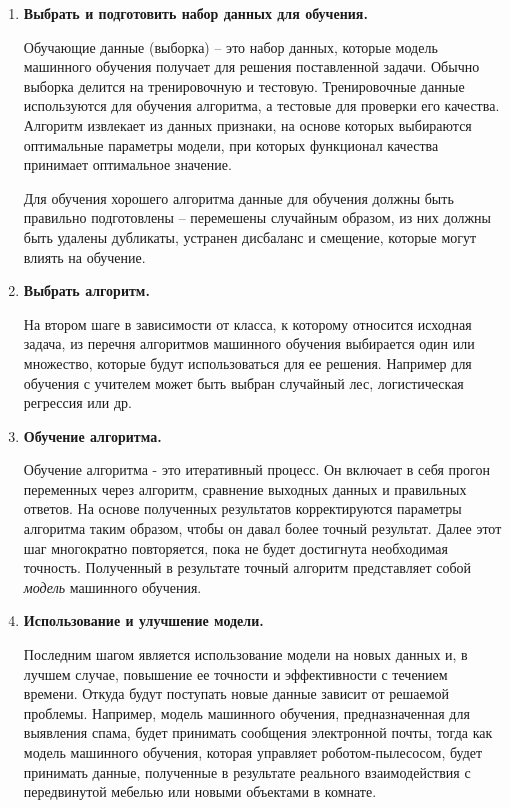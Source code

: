 \begin{enumerate}
	\item \textbf{Выбрать и подготовить набор данных для обучения.} 
	
	Обучающие данные (выборка) -- это набор данных, которые модель машинного обучения получает для решения поставленной задачи. Обычно выборка делится на тренировочную и тестовую. Тренировочные данные используются для обучения алгоритма, а тестовые для проверки его качества. Алгоритм извлекает из данных признаки, на основе которых выбираются оптимальные параметры модели, при которых функционал качества принимает оптимальное значение.
	
	Для обучения хорошего алгоритма данные для обучения должны быть правильно подготовлены -- перемешены случайным образом, из них должны быть удалены дубликаты,  устранен дисбаланс и смещение, которые могут влиять на обучение. 
	
	\item \textbf{Выбрать алгоритм.}
	
	На втором шаге в зависимости от класса, к которому относится исходная задача, из перечня алгоритмов машинного обучения выбирается один или множество, которые будут использоваться для ее решения. Например для обучения с учителем может быть выбран случайный лес, логистическая регрессия или др.
	
	\item \textbf{Обучение алгоритма.}
	
	Обучение алгоритма - это итеративный процесс. Он включает в себя прогон переменных через алгоритм, сравнение выходных данных и правильных ответов. На основе полученных результатов корректируются параметры алгоритма таким образом, чтобы он давал более точный результат. Далее этот шаг многократно повторяется, пока не будет достигнута необходимая точность. Полученный в результате точный алгоритм представляет собой {\it модель} машинного обучения.
	
	\item \textbf{Использование и улучшение модели.}
	
	Последним шагом является использование модели на новых данных и, в лучшем случае, повышение ее точности и эффективности с течением времени. Откуда будут поступать новые данные зависит от решаемой проблемы. Например, модель машинного обучения, предназначенная для выявления спама, будет принимать сообщения электронной почты, тогда как модель машинного обучения, которая управляет роботом-пылесосом, будет принимать данные, полученные в результате реального взаимодействия с передвинутой мебелью или новыми объектами в комнате. 
	
	
\end{enumerate}


